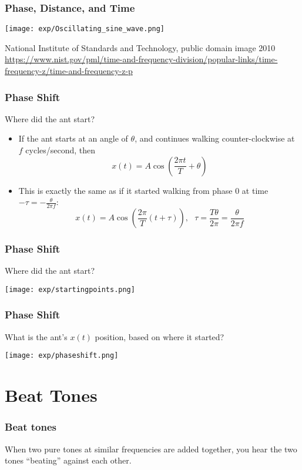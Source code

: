 \documentclass{beamer}
\begin{document}
\begin{frame}
  \frametitle{Phase, Distance, and Time}
  \centerline{\texttt{[image: exp/Oscillating\_sine\_wave.png]}}
  \begin{tiny}
    National Institute of Standards and Technology, public domain image 2010
    \url{https://www.nist.gov/pml/time-and-frequency-division/popular-links/time-frequency-z/time-and-frequency-z-p}
  \end{tiny}
\end{frame}

\begin{frame}
  \frametitle{Phase Shift}

  Where did the ant start?
  \begin{itemize}
  \item If the ant starts at an angle of $\theta$, and continues walking counter-clockwise
    at $f$ cycles/second, then
    \[
    x(t) = A\cos\left(\frac{2\pi t}{T}+\theta\right)
    \]
  \item This is exactly the same as if it started walking from phase 0 at time
    $-\tau=-\frac{\theta}{2\pi f}$:
    \[
    x(t) = A\cos\left(\frac{2\pi}{T}\left(t+\tau\right)\right),~~~
    \tau=\frac{T\theta}{2\pi} = \frac{\theta}{2\pi f}
    \]
  \end{itemize}
\end{frame}

\begin{frame}
  \frametitle{Phase Shift}

  Where did the ant start?
  
  \centerline{\texttt{[image: exp/startingpoints.png]}}
\end{frame}

\begin{frame}
  \frametitle{Phase Shift}
  
  What is the ant's $x(t)$ position, based on where it started?
  
  \centerline{\texttt{[image: exp/phaseshift.png]}}
\end{frame}

\section[Beating]{Beat Tones}
\setcounter{subsection}{1}

\begin{frame}
  \frametitle{Beat tones}

  When two pure tones at similar frequencies are added together, you hear the  two tones
  ``beating'' against each other.
  \vspace*{1cm}
  \centerline{}
\end{frame}
\end{document}
